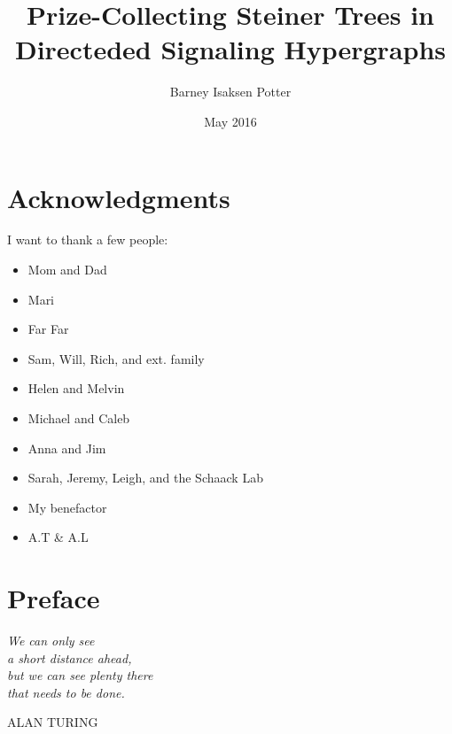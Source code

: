 \documentclass[12pt,twoside]{reedthesis}
\title{Prize-Collecting Steiner Trees in Directeded Signaling Hypergraphs}
\author{Barney Isaksen Potter}
\date{May 2016}
\theoremstyle{definition}
\newlength\longest
\begin{document}
  \maketitle
  \frontmatter %
  \pagestyle{empty} %

    \chapter*{Acknowledgments}
	I want to thank a few people:

  \begin{itemize}
    \item{Mom and Dad}
    \item{Mari}
    \item{Far Far}
    \item{Sam, Will, Rich, and ext. family}
    \item{Helen and Melvin}
    \item{Michael and Caleb}
    \item{Anna and Jim}
    \item{Sarah, Jeremy, Leigh, and the Schaack Lab}
    \item{My benefactor}
    \item{A.T \& A.L} %
  \end{itemize}

    \chapter*{Preface}
  \null\vfill

\settowidth{}
\begin{center}
\parbox{\longest}{%
  \raggedright{\huge\itshape%
   We can only see \\
  a short distance ahead, \\
  but we can see plenty there \\
  that needs to be done.\par\bigskip
  }
  \raggedleft\Large\MakeUppercase{Alan Turing}\par%
}
\end{center}
\end{document}
